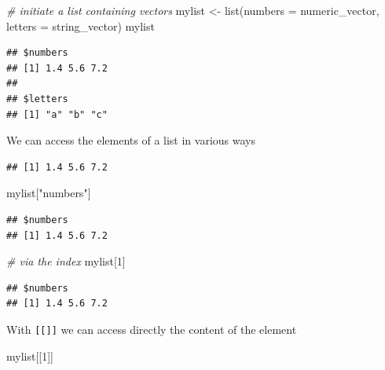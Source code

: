 \documentclass[
  12pt,
]{style/krantz}
\newenvironment{Shaded}{\begin{snugshade}}{\end{snugshade}}
\newcommand{\AttributeTok}[1]{\textcolor[rgb]{0.77,0.63,0.00}{#1}}
\newcommand{\CommentTok}[1]{\textcolor[rgb]{0.56,0.35,0.01}{\textit{#1}}}
\newcommand{\DecValTok}[1]{\textcolor[rgb]{0.00,0.00,0.81}{#1}}
\newcommand{\FunctionTok}[1]{\textcolor[rgb]{0.00,0.00,0.00}{#1}}
\newcommand{\NormalTok}[1]{#1}
\newcommand{\OtherTok}[1]{\textcolor[rgb]{0.56,0.35,0.01}{#1}}
\newcommand{\SpecialCharTok}[1]{\textcolor[rgb]{0.00,0.00,0.00}{#1}}
\newcommand{\StringTok}[1]{\textcolor[rgb]{0.31,0.60,0.02}{#1}}
\begin{document}
\begin{Shaded}
\begin{Highlighting}[]
\CommentTok{\# initiate a list containing vectors}
\NormalTok{mylist }\OtherTok{\textless{}{-}} \FunctionTok{list}\NormalTok{(}\AttributeTok{numbers =}\NormalTok{ numeric\_vector, }\AttributeTok{letters =}\NormalTok{ string\_vector)}
\NormalTok{mylist}
\end{Highlighting}
\end{Shaded}

\begin{verbatim}
## $numbers
## [1] 1.4 5.6 7.2
## 
## $letters
## [1] "a" "b" "c"
\end{verbatim}

We can access the elements of a list in various ways

\begin{Shaded}
\end{Shaded}

\begin{verbatim}
## [1] 1.4 5.6 7.2
\end{verbatim}

\begin{Shaded}
\begin{Highlighting}[]
\NormalTok{mylist[}\StringTok{"numbers"}\NormalTok{]}
\end{Highlighting}
\end{Shaded}

\begin{verbatim}
## $numbers
## [1] 1.4 5.6 7.2
\end{verbatim}

\begin{Shaded}
\begin{Highlighting}[]
\CommentTok{\# via the index}
\NormalTok{mylist[}\DecValTok{1}\NormalTok{]}
\end{Highlighting}
\end{Shaded}

\begin{verbatim}
## $numbers
## [1] 1.4 5.6 7.2
\end{verbatim}

With \texttt{{[}{[}{]}{]}} we can access directly the content of the element

\begin{Shaded}
\begin{Highlighting}[]
\NormalTok{mylist[[}\DecValTok{1}\NormalTok{]]}
\end{Highlighting}
\end{Shaded}
\end{document}
